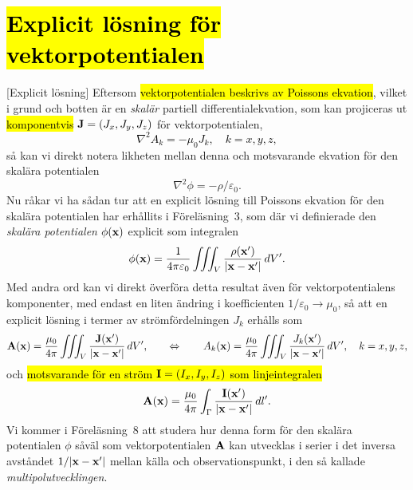 {{{\section{{\hl{Explicit l{\"o}sning f{\"o}r vektorpotentialen}}}
[Explicit l{\"o}sning]
Eftersom {\hl{vektorpotentialen beskrivs av Poissons ekvation}}, vilket i grund
och botten {\"a}r en {\it skal{\"a}r} partiell differentialekvation, som kan
projiceras ut {\hl{komponentvis}} ${\bf J}=(J_x,J_y,J_z)$ f{\"o}r
vektorpotentialen,
\hl{$$
  \nabla^2 A_k=-\mu_0 J_k,\quad k=x,y,z,
$$}
s{\aa} kan vi direkt notera likheten mellan denna och motsvarande ekvation
f{\"o}r den skal{\"a}ra potentialen
$$
  \nabla^2\phi=-\rho/\varepsilon_0.
$$
Nu r{\aa}kar vi ha s{\aa}dan tur att en explicit l{\"o}sning till Poissons
ekvation f{\"o}r den skal{\"a}ra potentialen har erh{\aa}llits i
F{\"o}rel{\"a}sning~3, som
d{\"a}r vi definierade den {\it skal{\"a}ra potentialen} $\phi({\bf x})$
explicit som integralen
$$
  \phi({\bf x})={{1}\over{4\pi\varepsilon_0}}\iiint_V
    {{\rho({\bf x}')}\over{|{\bf x}-{\bf x}'|}}\,dV'.
$$
Med andra ord kan vi direkt {\"o}verf{\"o}ra detta resultat {\"a}ven f{\"o}r
vektorpotentialens komponenter, med endast en liten {\"a}ndring i koefficienten
$1/\varepsilon_0\to\mu_0$, s{\aa} att en explicit l{\"o}sning i termer av
str{\"o}mf{\"o}rdelningen $J_k$ erh{\aa}lls som
\hl{$$
  {\bf A}({\bf x})={{\mu_0}\over{4\pi}}\iiint_V
    {{{\bf J}({\bf x}')}\over{|{\bf x}-{\bf x}'|}}\,dV',
  \qquad\Leftrightarrow\qquad
  A_k({\bf x})={{\mu_0}\over{4\pi}}\iiint_V
    {{J_k({\bf x}')}\over{|{\bf x}-{\bf x}'|}}\,dV',\quad k=x,y,z,
$$}
och {\hl{motsvarande f{\"o}r en str{\"o}m ${\bf I}=(I_x,I_y,I_z)$ som
linjeintegralen}}
\hl{$$
  {\bf A}({\bf x})={{\mu_0}\over{4\pi}}\int_{\Gamma}
    {{{\bf I}({\bf x}')}\over{|{\bf x}-{\bf x}'|}}\,dl'.
$$}
Vi kommer i F{\"o}rel{\"a}sning~8 att studera hur denna form f{\"o}r den
skal{\"a}ra potentialen $\phi$ s{\aa}v{\"a}l som vektorpotentialen ${\bf A}$
kan utvecklas i serier i det inversa avst{\aa}ndet $1/|{\bf x}-{\bf x}'|$ mellan
k{\"a}lla och observationspunkt, i den s{\aa} kallade {\it multipolutvecklingen}.
\vfill\eject

}}}

